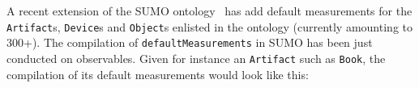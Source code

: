 \documentclass[11pt]{article}
\begin{document}



A recent extension of the SUMO ontology~\cite[Suggested Upper Merged Ontology]{nilespease2001sumo} has add
default measurements for the \texttt{Artifact}s, \texttt{Device}s and \texttt{Object}s enlisted in the ontology (currently amounting to 300+). 
The compilation of \texttt{defaultMeasurements} in SUMO has been just conducted on observables. Given for instance an \texttt{Artifact} such as \texttt{Book}, the compilation of its default measurements would look like this:
\end{document}

